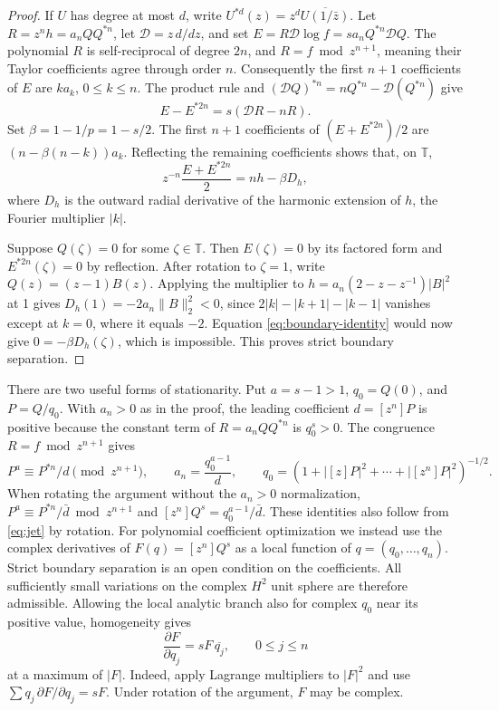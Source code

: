 \documentclass[11pt]{article}
\newcommand{\T}{\mathbb T}
\newcommand{\Dif}{\mathcal D}
\newcommand{\coef}[1]{[z^{#1}]}
\begin{document}
\begin{proof}
If \(U\) has degree at most \(d\), write \(U^{*d}(z)=
z^d\overline{U(1/\bar z)}\).
Let \(R=z^n h=a_n QQ^{*n}\), let \(\Dif=z\,d/dz\), and set
\(E=R\Dif\log f=s a_n Q^{*n}\Dif Q\).
The polynomial \(R\) is self-reciprocal of degree \(2n\), and
\(R=f\bmod z^{n+1}\), meaning their Taylor coefficients agree through
order \(n\). Consequently the first \(n+1\) coefficients of \(E\)
are \(k a_k\), \(0\le k\le n\). The product rule and
\((\Dif Q)^{*n}=nQ^{*n}-\Dif(Q^{*n})\) give
\[
 E-E^{*2n}=s(\Dif R-nR).
\]
Set \(\beta=1-1/p=1-s/2\). The first \(n+1\) coefficients of
\((E+E^{*2n})/2\) are \((n-\beta(n-k))a_k\).
Reflecting the remaining coefficients shows that, on \(\T\),
\begin{equation}\label{eq:boundary-identity}
 z^{-n}\frac{E+E^{*2n}}{2}=nh-\beta D_h,
\end{equation}
where \(D_h\) is the outward radial derivative of the harmonic
extension of \(h\), the Fourier multiplier \(|k|\).

Suppose \(Q(\zeta)=0\) for some \(\zeta\in\T\). Then \(E(\zeta)=0\)
by its factored form and \(E^{*2n}(\zeta)=0\) by reflection.
After rotation to \(\zeta=1\), write \(Q(z)=(z-1)B(z)\).
Applying the multiplier to
\(h=a_n(2-z-z^{-1})|B|^2\) at 1 gives
\(D_h(1)=-2a_n\|B\|_2^2<0\), since
\(2|k|-|k+1|-|k-1|\) vanishes except at \(k=0\), where it
equals \(-2\). Equation \eqref{eq:boundary-identity} would now give
\(0=-\beta D_h(\zeta)\), which is impossible. This proves strict
boundary separation.
\end{proof}

There are two useful forms of stationarity. Put \(a=s-1>1\),
\(q_0=Q(0)\), and \(P=Q/q_0\). With \(a_n>0\) as in the proof,
the leading coefficient \(d=\coef n P\) is positive because the
constant term of \(R=a_n QQ^{*n}\) is \(q_0^s>0\).
The congruence \(R=f\bmod z^{n+1}\) gives
\begin{equation}\label{eq:jet}
 P^a\equiv P^{*n}/d\pmod{z^{n+1}},\qquad
 a_n=\frac{q_0^{a-1}}{d},\qquad
 q_0=(1+|[z]P|^2+\cdots+|\coef nP|^2)^{-1/2}.
\end{equation}
When rotating the argument without the \(a_n>0\) normalization,
\(P^a\equiv P^{*n}/\bar d\bmod z^{n+1}\) and
\(\coef n Q^s=q_0^{a-1}/\bar d\). These identities also follow
from \eqref{eq:jet} by rotation.
For polynomial coefficient optimization we instead use the complex
derivatives of \(F(q)=\coef n Q^s\) as a local function of
\(q=(q_0,\ldots,q_n)\). Strict boundary separation is an open
condition on the coefficients. All sufficiently small variations
on the complex \(H^2\) unit sphere are therefore admissible.
Allowing the local analytic branch also for complex \(q_0\) near
its positive value, homogeneity gives
\begin{equation}\label{eq:sphere-lagrange}
 \frac{\partial F}{\partial q_j}=s F\,\overline{q_j},
                  \qquad 0\le j\le n
\end{equation}
at a maximum of \(|F|\). Indeed, apply Lagrange multipliers to
\(|F|^2\) and use \(\sum q_j\,\partial F/\partial q_j=sF\).
Under rotation of the argument, \(F\) may be complex.
\end{document}
